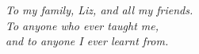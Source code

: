 \setcounter{page}{2}

\begin{flushright}
	\emph{To my family, Liz, and all my friends.} \\
	\vspace{1cm}
	\emph{To anyone who ever taught me, \\ and to anyone I ever learnt from.}
\end{flushright}